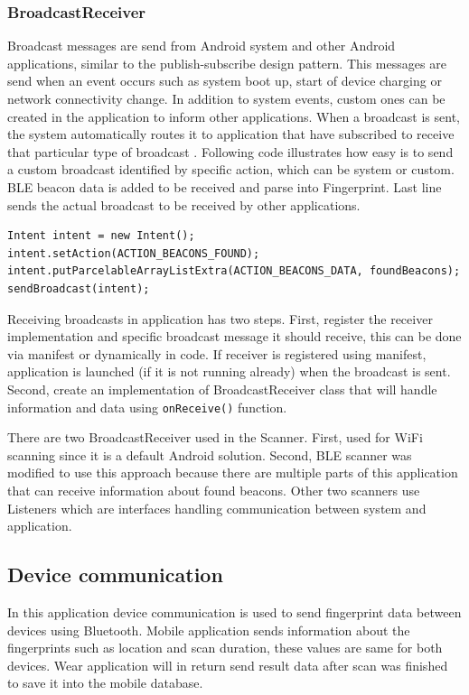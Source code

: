 \subsubsection{BroadcastReceiver}\label{subsubsec:BroadcastReceiver}
Broadcast messages are send from Android system and other Android applications, similar to the publish-subscribe design pattern. This messages are send when an event occurs such as system boot up, start of device charging or network connectivity change. In addition to system events, custom ones can be created in the application to inform other applications. When a broadcast is sent, the system automatically routes it to application that have subscribed to receive that particular type of broadcast \cite{AD}. Following code illustrates how easy is to send a custom broadcast identified by specific action, which can be system or custom. BLE beacon data is added to be received and parse into Fingerprint. Last line sends the actual broadcast to be received by other applications.

\begin{lstlisting}[caption=Send broadcast with BLE beacons found.]
Intent intent = new Intent();
intent.setAction(ACTION_BEACONS_FOUND);
intent.putParcelableArrayListExtra(ACTION_BEACONS_DATA, foundBeacons);
sendBroadcast(intent);
\end{lstlisting}

Receiving broadcasts in application has two steps. First, register the receiver implementation and specific broadcast message it should receive, this can be done via manifest or dynamically in code. If receiver is registered using manifest, application is launched (if it is not running already) when the broadcast is sent. Second, create an implementation of BroadcastReceiver class that will handle information and data using \verb|onReceive()| function.

There are two BroadcastReceiver used in the Scanner. First, used for WiFi scanning since it is a default Android solution. Second, BLE scanner was modified to use this approach because there are multiple parts of this application that can receive information about found beacons. Other two scanners use Listeners which are interfaces handling communication between system and application.

\subsection{Device communication}\label{subsec:DeviceCommunication}
In this application device communication is used to send fingerprint data between devices using Bluetooth. Mobile application sends information about the fingerprints such as location and scan duration, these values are same for both devices. Wear application will in return send result data after scan was finished to save it into the mobile database.

